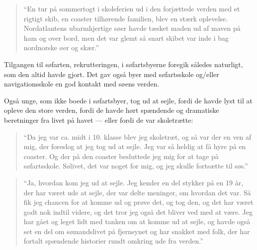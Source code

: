 \begin{quote}
    ``En tur på sommertogt i skoleferien ud i den forjættede verden med et
    rigtigt skib, en coaster tilhørende familien, blev en stærk oplevelse.
    Nordatlantens ubarmhjertige søer havde tæsket maden ud af maven på ham og
    over bord, men det var glemt så snart skibet var inde i
     bag nordnorske øer og skær.''
\end{quote}

Tilgangen til søfarten, rekrutteringen, i søfartsbyerne foregik således
naturligt, som den altid havde gjort. Det gav også byer med søfartsskole
og/eller navigationsskole en god kontakt med søens verden. 

Også unge, som ikke boede i søfartsbyer, tog ud at sejle, fordi de havde
lyst til at opleve den store verden, fordi de havde hørt spændende og
dramatiske beretninger fra livet på havet --- eller fordi de var
skoletrætte: 

\begin{quote}
    ``Da jeg var ca. midt i 10. klasse blev jeg skoletræt, og så var der en
    ven af mig, der foreslog at jeg tog ud at sejle. Jeg var så heldig at få
    hyre på en coaster. Og der på den coaster besluttede jeg mig for at tage
    på søfartsskole. Sølivet, det var noget for mig, og jeg skulle fortsætte
    til søs.''
\end{quote}

\begin{quote}
    ``Ja, hvordan kom jeg ud at sejle. Jeg kender en del stykker på en 19 år,
    der har været ude at sejle, der var delte meninger, om hvordan det var. Så
    fik jeg chancen for at komme ud og prøve det, og tog den, og det har været
    godt nok indtil videre, og det tror jeg også det bliver ved med at være.
    Jeg har gået og leget lidt med tanken om at komme ud at sejle, og havde
    også set en del om sømandslivet på fjernsynet og har snakket med folk, der
    har fortalt spændende historier rundt omkring ude fra verden.''
\end{quote}

